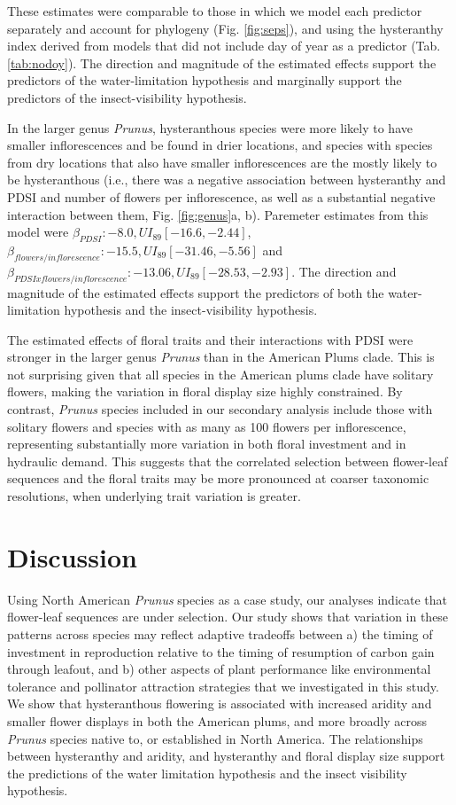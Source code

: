 \documentclass{article}[12pt]
\begin{document}
{These estimates were comparable to those in which we model each predictor separately and account for phylogeny (Fig. \ref{fig:seps}), and using the hysteranthy index derived from models that did not include day of year as a predictor (Tab. \ref{tab:nodoy}). The direction and magnitude of the estimated effects support the predictors of the water-limitation hypothesis and marginally support the predictors of the insect-visibility hypothesis.

In the larger genus \emph{Prunus}, hysteranthous species were more likely to have smaller inflorescences and be found in drier locations, and species with species from dry locations that also have smaller inflorescences are the mostly likely to be hysteranthous (i.e., there was a negative association between hysteranthy and PDSI and number of flowers per inflorescence, as well as a substantial negative interaction between them, Fig. \ref{fig:genus}a, b). Paremeter estimates from this model were  $\beta_{PDSI}:-8.0, UI_{89}[-16.6,-2.44]$,  $\beta_{flowers/inflorescence}: -15.5, UI_{89}[-31.46,-5.56]$ and $\beta_{PDSI x flowers/inflorescence}: -13.06, UI_{89}[-28.53,-2.93]$.  The direction and magnitude of the estimated effects support the predictors of both the water-limitation hypothesis and the insect-visibility hypothesis.

The estimated effects of floral traits and their interactions with PDSI were stronger in the larger genus \emph{Prunus} than in the American Plums clade.
This is not surprising given that all species in the American plums clade have solitary flowers, making the variation in floral display size highly constrained. By contrast, \emph{Prunus} species included in our secondary analysis include those with  solitary flowers and species with as many as 100 flowers per inflorescence, representing substantially more variation in both floral investment and in hydraulic demand. This suggests that the correlated selection between flower-leaf sequences and the floral traits may be more pronounced at coarser taxonomic resolutions, when underlying trait variation is greater.

\section*{Discussion}
Using North American \textit{Prunus} species as a case study, our analyses indicate that flower-leaf sequences are under selection. Our study shows that variation in these patterns across species may reflect adaptive tradeoffs between a) the timing of investment in reproduction relative to the timing of resumption of carbon gain through leafout, and b) other aspects of plant performance like environmental tolerance and pollinator attraction strategies that we investigated in this study. We show that hysteranthous flowering is associated with increased aridity and smaller flower displays in both the American plums, and more broadly across \emph{Prunus} species native to, or established in North America. The relationships between hysteranthy and aridity, and hysteranthy and floral display size support the predictions of the water limitation hypothesis and the insect visibility hypothesis. 

}
\end{document}
